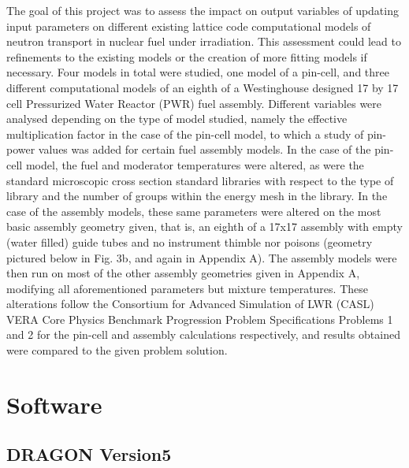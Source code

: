 \documentclass[12pt]{article}
\begin{document}
The goal of this project was to assess the impact on output variables of updating input parameters on different existing lattice code computational models of neutron transport in nuclear fuel under irradiation. This assessment could lead to refinements to the existing models or the creation of more fitting models if necessary. Four models in total were studied, one model of a pin-cell, and three different computational models of an eighth of a Westinghouse designed 17 by 17 cell Pressurized Water Reactor (PWR) fuel assembly. Different variables were analysed depending on the type of model studied, namely the effective multiplication factor in the case of the pin-cell model, to which a study of pin-power values was added for certain fuel assembly models. In the case of the pin-cell model, the fuel and moderator temperatures were altered, as were the standard microscopic cross section standard libraries with respect to the type of library and the number of groups within the energy mesh in the library. In the case of the assembly models, these same parameters were altered on the most basic assembly geometry given, that is, an eighth of a 17x17 assembly with empty (water filled) guide tubes and no instrument thimble nor poisons (geometry pictured below in Fig. 3b, and again in Appendix A). The assembly models were then run on most of the other assembly geometries given in Appendix A, modifying all aforementioned parameters but mixture temperatures. These alterations follow the Consortium for Advanced Simulation of LWR (CASL) VERA Core Physics Benchmark Progression Problem Specifications \cite{godfrey2013vera} Problems 1 and 2 for the pin-cell and assembly calculations respectively, and results obtained were compared to the given problem solution. 


\section{Software}

\subsection{DRAGON Version5}
\end{document}
